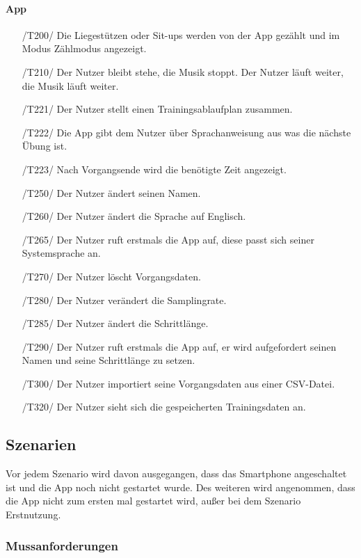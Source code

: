 \documentclass[a4paper,12pt]{article}
\begin{document}
  \paragraph{App}
  \begin{itemize}
    \item[/T200/] Die Liegestützen oder Sit-ups werden von der App gezählt und im Modus \glqq{}Zählmodus \grqq{} angezeigt.
    \item[/T210/] Der Nutzer bleibt stehe, die Musik stoppt. Der Nutzer läuft weiter, die Musik läuft weiter.
    \item[/T221/] Der Nutzer stellt einen Trainingsablaufplan zusammen.
    \item[/T222/] Die App gibt dem Nutzer über Sprachanweisung aus was die nächste Übung ist.
    \item[/T223/] Nach Vorgangsende wird die benötigte Zeit angezeigt.
    \item[/T250/] Der Nutzer ändert seinen Namen.
    \item[/T260/] Der Nutzer ändert die Sprache auf Englisch.
    \item[/T265/] Der Nutzer ruft erstmals die App auf, diese passt sich seiner Systemsprache an.
    \item[/T270/] Der Nutzer löscht Vorgangsdaten.
    \item[/T280/] Der Nutzer verändert die Samplingrate.
    \item[/T285/] Der Nutzer ändert die Schrittlänge.
    \item[/T290/] Der Nutzer ruft erstmals die App auf, er wird aufgefordert seinen Namen und seine Schrittlänge zu setzen.
    \item[/T300/] Der Nutzer importiert seine Vorgangsdaten aus einer CSV-Datei.
    \item[/T320/] Der Nutzer sieht sich die gespeicherten Trainingsdaten an.
   \end{itemize}
   
  \subsection{Szenarien}
	Vor jedem Szenario wird davon ausgegangen, dass das Smartphone angeschaltet ist und die App noch nicht gestartet wurde. Des weiteren wird angenommen, dass die App nicht zum ersten mal gestartet wird, außer bei dem Szenario \glqq{}Erstnutzung\grqq{}.
    \subsubsection{Mussanforderungen}
\end{document}
